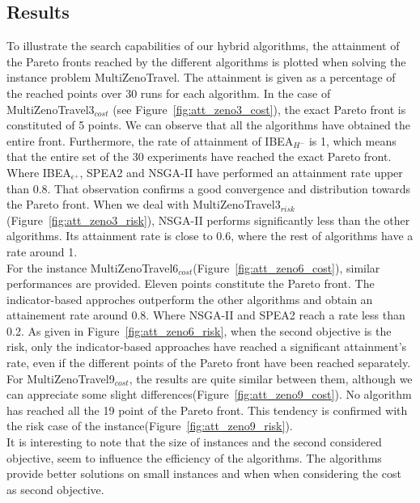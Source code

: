 \documentclass[a4paper,10pt]{article}
\begin{document}
\subsection{Results}
To illustrate the search capabilities of our hybrid algorithms, the  attainment of the Pareto fronts reached by the different algorithms
is plotted when solving the instance problem MultiZenoTravel.  The attainment is given as a percentage of the reached points over 30 runs  for each algorithm. 
In the case of MultiZenoTravel3$_{cost}$ (see Figure~\ref{fig:att_zeno3_cost}), the exact Pareto front is constituted of 5 points. 
We can observe that all the algorithms have obtained the entire front. Furthermore, the rate of attainment of IBEA$_{H^-}$ is 1, which means that the entire set of the 30 experiments have reached the exact Pareto front. Where IBEA$_{\epsilon^+}$, SPEA2 and NSGA-II 
have performed an attainment rate upper than 0.8. That observation confirms a good convergence and distribution towards the Pareto front. 
When we deal with MultiZenoTravel3$_{risk}$ (Figure~\ref{fig:att_zeno3_risk}), NSGA-II performs significantly less than the other algorithms.
Its attainment rate is close to 0.6, where the rest of algorithms have a rate around 1. \\
For the instance MultiZenoTravel6$_{cost}$(Figure~\ref{fig:att_zeno6_cost}), similar performances are provided. Eleven points constitute the Pareto front. 
The indicator-based approches outperform the other algorithms and obtain an attainement rate around 0.8. Where NSGA-II and SPEA2 reach a rate less than 0.2.
As given in Figure~\ref{fig:att_zeno6_risk}, when the second objective is the risk, only the indicator-based approaches have reached a significant attainment's rate, even if the different points of the Pareto front have been reached separately. 
For MultiZenoTravel9$_{cost}$, the  results are quite similar between them, although we can appreciate some slight differences(Figure~\ref{fig:att_zeno9_cost}).
No algorithm has reached all the 19 point of the Pareto front. This tendency is confirmed with the risk case of the instance(Figure~\ref{fig:att_zeno9_risk}).\\
It is interesting to note that the size of instances  and the  second considered objective, 
seem to  influence the efficiency of the algorithms. The algorithms provide  better solutions on small instances and when when considering the cost as second objective.
\end{document}
